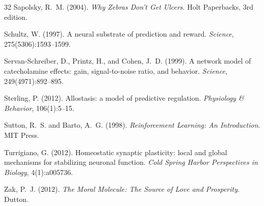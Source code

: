 \documentclass[11pt,a4paper]{article}
\begin{document}
\begin{thebibliography}{32}
Sapolsky, R.~M. (2004).
\newblock \emph{Why Zebras Don't Get Ulcers}.
\newblock Holt Paperbacks, 3rd edition.

Schultz, W. (1997).
\newblock A neural substrate of prediction and reward.
\newblock \emph{Science}, 275(5306):1593--1599.

Servan-Schreiber, D., Printz, H., and Cohen, J.~D. (1999).
\newblock A network model of catecholamine effects: gain, signal-to-noise ratio, and behavior.
\newblock \emph{Science}, 249(4971):892--895.

Sterling, P. (2012).
\newblock Allostasis: a model of predictive regulation.
\newblock \emph{Physiology \& Behavior}, 106(1):5--15.

Sutton, R.~S. and Barto, A.~G. (1998).
\newblock \emph{Reinforcement Learning: An Introduction}.
\newblock MIT Press.

Turrigiano, G. (2012).
\newblock Homeostatic synaptic plasticity: local and global mechanisms for stabilizing neuronal function.
\newblock \emph{Cold Spring Harbor Perspectives in Biology}, 4(1):a005736.

Zak, P.~J. (2012).
\newblock \emph{The Moral Molecule: The Source of Love and Prosperity}.
\newblock Dutton.

\end{thebibliography}
\end{document}
